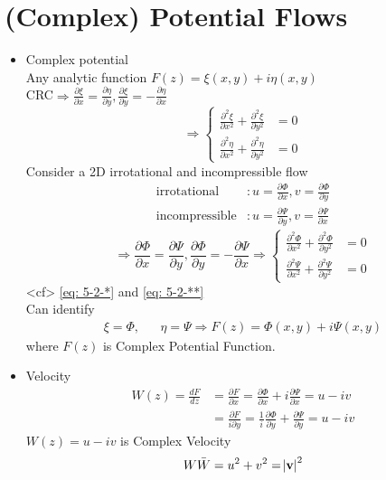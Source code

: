 \section{(Complex) Potential Flows}
\begin{itemize}
\item Complex potential \\
Any analytic function $F(z) = \xi(x,y) + i\eta(x,y)$\\
CRC$\displaystyle\Longrightarrow\frac{\partial\xi}{\partial x} = \frac{\partial\eta}{\partial y},\frac{\partial\xi}{\partial y} = -\frac{\partial\eta}{\partial x}$
\begin{equation}
\Longrightarrow
\left\{
\begin{aligned}
\frac{\partial^2\xi}{\partial x^2} + \frac{\partial^2\xi}{\partial y^2} &= 0 \\
\frac{\partial^2\eta}{\partial x^2} + \frac{\partial^2\eta}{\partial y^2} &= 0
\end{aligned}
\right.
\tag{$\ast$}
\label{eq: 5-2-*}
\end{equation}
Consider a 2D irrotational and incompressible flow
\begin{align*}
\text{irrotational}&\colon u = \frac{\partial\Phi}{\partial x}, v= \frac{\partial\Phi}{\partial y} \\
\text{incompressible}&\colon u = \frac{\partial\Psi}{\partial y}, v= \frac{\partial\Psi}{\partial x}
\end{align*}
\begin{equation}
\Longrightarrow
\frac{\partial\Phi}{\partial x} = \frac{\partial\Psi}{\partial y}, \frac{\partial\Phi}{\partial y} = -\frac{\partial\Psi}{\partial x}
\Longrightarrow
\left\{
\begin{aligned}
\frac{\partial^2\Phi}{\partial x^2} + \frac{\partial^2\Phi}{\partial y^2} &= 0 \\
\frac{\partial^2\Psi}{\partial x^2} + \frac{\partial^2\Psi}{\partial y^2} &= 0
\end{aligned}
\right.
\tag{$\ast\ast$}
\label{eq: 5-2-**}
\end{equation}
<cf> \eqref{eq: 5-2-*} and \eqref{eq: 5-2-**}\\
Can identify
\begin{align}
\xi =\Phi, && \eta = \Psi\Longrightarrow F(z) = \Phi(x,y) + i\Psi(x,y)
\label{eq: 5-2-1}
\end{align}
where $F(z)$ is Complex Potential Function.
\item Velocity
\begin{align*}
W(z) = \frac{dF}{dz}
&= \frac{\partial F}{\partial x} = \frac{\partial\Phi}{\partial x} + i\frac{\partial\Psi}{\partial x} = u - iv \\
&= \frac{\partial F}{i\partial y} = \frac{1}{i}\frac{\partial\Phi}{\partial y} + \frac{\partial\Psi}{\partial y} = u - iv
\end{align*}
$W(z)=u-iv$ is Complex Velocity 
\[
W\bar{W} = u^2 + v^2 = \abs{\mathbf{v}}^2
\]
\end{itemize}
